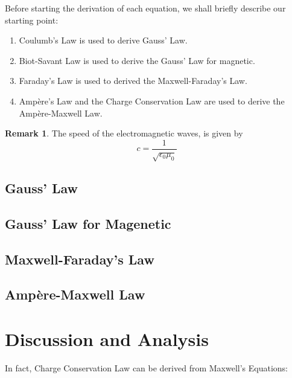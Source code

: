 \documentclass{article}
\theoremstyle{definition}
\newtheorem{re}[thm]{Remark}
\begin{document}
Before starting the derivation of each equation, we shall briefly describe our starting point:
\begin{enumerate}
    \item Coulumb's Law is used to derive Gauss' Law.
    \item Biot-Savant Law is used to derive the Gauss' Law for magnetic.
    \item Faraday's Law is used to derived the Maxwell-Faraday's Law.
    \item Ampère's Law and the Charge Conservation Law are used to derive the Ampère-Maxwell Law.
\end{enumerate}

\begin{re}
    The speed of the electromagnetic waves, is given by 
    \[c = \frac{1}{\sqrt{\epsilon_0 \mu_0}}\]
\end{re}

\subsection{Gauss' Law}

\subsection{Gauss' Law for Magenetic}

\subsection{Maxwell-Faraday's Law}

\subsection{Ampère-Maxwell Law}

\section{Discussion and Analysis}

In fact, Charge Conservation Law can be derived from Maxwell's Equations:

\medskip 
\end{document}
